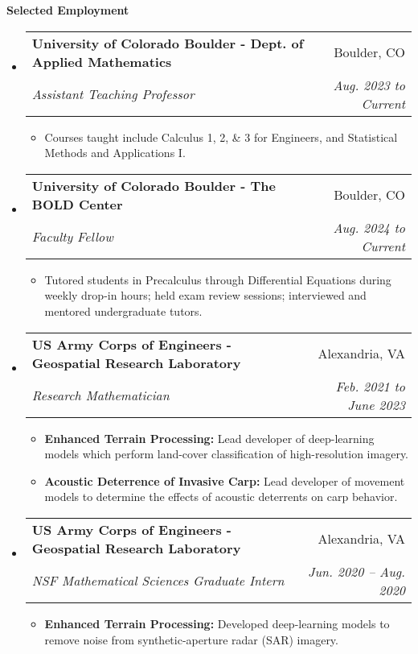 \documentclass[letterpaper,11pt]{article}
\makeatletter
\newcommand{\resitem}[1]{\item #1 \vspace{-2pt}}
\newcommand{\resheading}[1]{{\large \colorbox{mygrey}{\begin{minipage}{\textwidth}{\textbf{#1 \vphantom{p\^{E}}}}\end{minipage}}}}
\newcommand{\ressubheading}[4]{
\begin{tabular*}{6.5in}{l@{\extracolsep{\fill}}r}
		\textbf{#1} & #2 \\
		\textit{#3} & \textit{#4} \\
\end{tabular*}\vspace{-6pt}}
\makeatother
\begin{document}
\resheading{Selected Employment}
\begin{itemize}
	\item
	\ressubheading{University of Colorado Boulder - Dept. of Applied Mathematics}{Boulder, CO}{Assistant Teaching Professor}{Aug. 2023 to Current}
	{\footnotesize
		\begin{itemize}
			\item Courses taught include Calculus 1, 2, \& 3 for Engineers, and Statistical Methods and Applications I.
		\end{itemize}
	}
	\item
	\ressubheading{University of Colorado Boulder - The BOLD Center}{Boulder, CO}{Faculty Fellow}{Aug. 2024 to Current}
	{\footnotesize
		\begin{itemize}
			\item Tutored students in Precalculus through Differential Equations during weekly drop-in hours; held exam review sessions; interviewed and mentored undergraduate tutors.
		\end{itemize}
	}
	\item
	\ressubheading{US Army Corps of Engineers - Geospatial Research Laboratory}{Alexandria, VA}{Research Mathematician}{Feb. 2021 to June 2023}
	{\footnotesize
		\begin{itemize}
			\resitem{\textbf{Enhanced Terrain Processing:} Lead developer of deep-learning models which perform land-cover classification of high-resolution imagery.
			}
			\resitem{\textbf{Acoustic Deterrence of Invasive Carp:} Lead developer of movement models to determine the effects of acoustic deterrents on carp behavior.
			}
		\end{itemize}
	}
	
	\item
	\ressubheading{US Army Corps of Engineers - Geospatial Research Laboratory}{Alexandria, VA}{NSF Mathematical Sciences Graduate Intern}{Jun. 2020 -- Aug. 2020}
	{\footnotesize
		\begin{itemize}
			\resitem{\textbf{Enhanced Terrain Processing:} Developed deep-learning models to remove noise from synthetic-aperture radar (SAR) imagery.
			}
	\end{itemize}}
	

\end{itemize}
\end{document}
